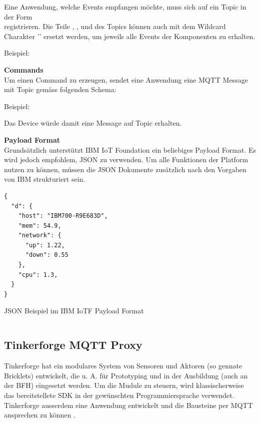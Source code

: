 Eine Anwendung, welche Events empfangen möchte, muss sich auf ein Topic in der Form \\
 registrieren.
Die Teile , ,  und  des Topics können auch mit dem Wildcard Charakter '\code{+}' ersetzt werden, um jeweils alle Events der Komponenten zu erhalten. 

Beispiel: 

\textbf{Commands} \\
Um einen Command zu erzeugen, sendet eine Anwendung eine MQTT Message mit Topic gemäss folgenden Schema:

Beispiel: 

Das Device  würde damit eine Message auf Topic  erhalten.


\textbf{Payload Format} \\
Grundsätzlich unterstützt IBM IoT Foundation ein beliebiges Payload Format. Es wird jedoch empfohlem, JSON zu verwenden. Um alle Funktionen der Platform nutzen zu können, müssen die JSON Dokumente zusätzlich nach den Vorgaben \cite{ibmIotF:payload} von IBM strukturiert sein.

\begin{listing}[H]
\begin{verbatim}
{
  "d": {
    "host": "IBM700-R9E683D",
    "mem": 54.9,
    "network": {
      "up": 1.22,
      "down": 0.55
    },
    "cpu": 1.3,
  }
}
\end{verbatim}
\caption{JSON Beispiel im IBM IoTF Payload Format}
\end{listing}
\begin{verbatim}
\end{verbatim}


\subsection{Tinkerforge MQTT Proxy}

Tinkerforge hat ein modulares System von Sensoren und Aktoren (so gennate Bricklets) entwickelt, die u. A. für Prototyping und in der Ausbildung (auch an der BFH) eingesetzt werden. Um die Mudule zu steuern, wird klassischerweise das bereitstellete SDK in der gewünschten Programmiersprache verwendet. 
Tinkerforge ausserdem eine Anwendung entwickelt und die Bausteine per MQTT ansprechen zu können \cite{tinkerf:mqtt}.


